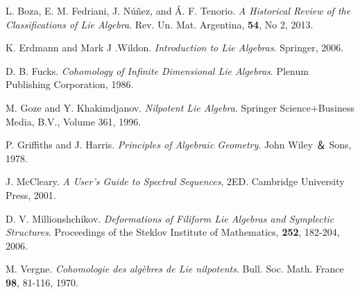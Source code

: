 \documentclass[titlepage,12pt]{article}
\begin{document}
\begin{thebibliography}{99}
\item
L. Boza, E. M. Fedriani, J. N\'{u}\~{n}ez, and \'{A}. F. Tenorio. \textit{A Historical Review of the Classifications of Lie Algebra}. Rev. Un. Mat. Argentina, \textbf{54}, No 2, 2013.
\item
K. Erdmann and Mark J .Wildon. \textit{Introduction to Lie Algebras}. Springer, 2006.
\item
D. B. Fucks. \textit{Cohomology of Infinite Dimensional Lie Algebras}. Plenum Publishing Corporation, 1986.
\item
M. Goze and Y. Khakimdjanov. \textit{Nilpotent Lie Algebra}. Springer Science+Business Media, B.V., Volume 361, 1996.
\item
P. Griffiths and J. Harris. \textit{Principles of Algebraic Geometry}. John Wiley ＆ Sons, 1978.
\item
J. McCleary. \textit{A User's Guide to Spectral Sequences}, 2ED. Cambridge University Press, 2001.
\item
D. V. Millionshchikov. \textit{Deformations of Filiform Lie Algebras and Symplectic Structures}. Proceedings of the Steklov Institute of Mathematics, \textbf{252}, 182-204, 2006.
\item
M. Vergne. \textit{Cohomologie des alg\`{e}bres de Lie nilpotents}. Bull. Soc. Math. France \textbf{98}, 81-116, 1970.
\end{thebibliography}
\end{document}
